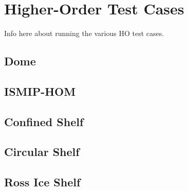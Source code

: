 
\section{Higher-Order Test Cases}

Info here about running the various HO test cases.

\subsection{Dome}

\subsection{ISMIP-HOM}

\subsection{Confined Shelf}

\subsection{Circular Shelf}

\subsection{Ross Ice Shelf}
